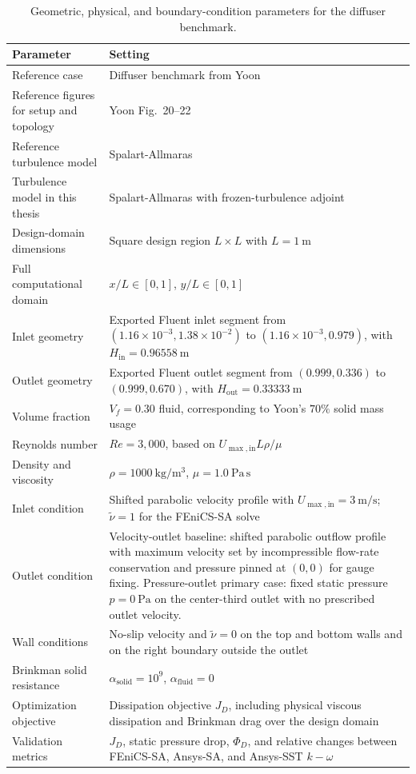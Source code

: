 \begin{table}[htbp]
	\centering
	\footnotesize
	\caption{Geometric, physical, and boundary-condition parameters for the diffuser benchmark.}
	\label{tab:app_B_yoon_diffuser_physical}
	\renewcommand{\arraystretch}{1.2}
	\begin{tabularx}{\textwidth}{l X}
		\hline
		\textbf{Parameter} & \textbf{Setting} \\
		\hline
		Reference case & Diffuser benchmark from Yoon~\cite{Yoon2016} \\
		Reference figures for setup and topology & Yoon Fig.~20--22 \\
		Reference turbulence model & Spalart-Allmaras \\
		Turbulence model in this thesis & Spalart-Allmaras with frozen-turbulence adjoint \\
		Design-domain dimensions & Square design region $L\times L$ with $L=1~\mathrm{m}$ \\
		Full computational domain & $x/L\in[0,1]$, $y/L\in[0,1]$ \\
		Inlet geometry & Exported Fluent inlet segment from $(1.16\times10^{-3},1.38\times10^{-2})$ to $(1.16\times10^{-3},0.979)$, with $H_{\mathrm{in}}=0.96558~\mathrm{m}$ \\
		Outlet geometry & Exported Fluent outlet segment from $(0.999,0.336)$ to $(0.999,0.670)$, with $H_{\mathrm{out}}=0.33333~\mathrm{m}$ \\
		Volume fraction & $V_f=0.30$ fluid, corresponding to Yoon's $70\%$ solid mass usage \\
		Reynolds number & $Re=3{,}000$, based on $U_{\max,\mathrm{in}}L\rho/\mu$ \\
		Density and viscosity & $\rho=1000~\mathrm{kg/m^3}$, $\mu=1.0~\mathrm{Pa\,s}$ \\
		Inlet condition & Shifted parabolic velocity profile with $U_{\max,\mathrm{in}}=3~\mathrm{m/s}$; $\tilde{\nu}=1$ for the FEniCS-SA solve \\
		Outlet condition & Velocity-outlet baseline: shifted parabolic outflow profile with maximum velocity set by incompressible flow-rate conservation and pressure pinned at $(0,0)$ for gauge fixing. Pressure-outlet primary case: fixed static pressure $p=0~\mathrm{Pa}$ on the center-third outlet with no prescribed outlet velocity. \\
		Wall conditions & No-slip velocity and $\tilde{\nu}=0$ on the top and bottom walls and on the right boundary outside the outlet \\
		Brinkman solid resistance & $\alpha_{\mathrm{solid}}=10^9$, $\alpha_{\mathrm{fluid}}=0$ \\
		Optimization objective & Dissipation objective $J_D$, including physical viscous dissipation and Brinkman drag over the design domain \\
		Validation metrics & $J_D$, static pressure drop, $\Phi_D$, and relative changes between FEniCS-SA, Ansys-SA, and Ansys-SST $k-\omega$ \\
		\hline
	\end{tabularx}
\end{table}

